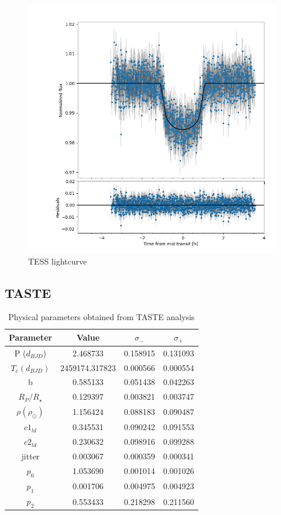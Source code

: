 \documentclass[a4paper,11pt,twocolumn]{article}
\begin{document}
\begin{figure}
  \centering
    \includegraphics[scale=0.3, angle=0]{../pictures/tess/lctess.png}
    \caption{TESS lightcurve}
   \label{fig: lc1}
\end{figure}

\newpage
\subsection{TASTE}


 \begin{table}[h!]
 \centering
    \begin{tabular}{cccc}
    \hline
     Parameter& Value & $\sigma_{-}$ & $\sigma_{+}$\\
    \hline
    P ($d_{BJD}$)   &  2.468733    &  0.158915  &  0.131093 \\
    $T_{c} (d_{BJD})$ &  2459174.317823 & 0.000566  &  0.000554  \\ 
    b &  0.585133  & 0.051438    &  0.042263  \\
    $R_{P }/ R_{\star}$ & 0.129397 & 0.003821 &  0.003747 \\
    $\rho (\rho_{\odot})$ & 1.156424 &0.088183   &   0.090487 \\
    $c1_{ld}$ &  0.345531     & 0.090242  &  0.091553 \\
    $c2_{ld}$ &0.230632 & 0.098916 &0.099288\\
    jitter & 0.003067  &0.000359  &0.000341\\
    $p_{0}$ & 1.053690  & 0.001014&  0.001026\\
    $p_{1}$ &0.001706 &0.004975  & 0.004923\\
    $p_{2}$ &0.553433  &0.218298  & 0.211560\\ 
    \hline
    \end{tabular} 
   \caption{Physical parameters obtained from TASTE analysis}
 \label{table:3}
 \end{table}
\end{document}
